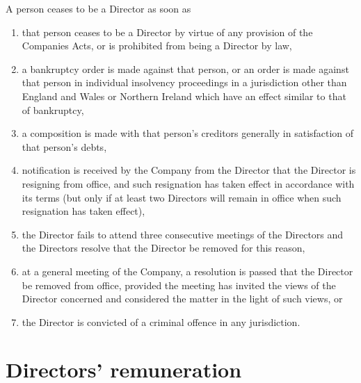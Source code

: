 \documentclass[a4paper,12pt]{article}
\renewcommand{\labelenumi}{\thesection.\arabic{enumi}}
\begin{document}
A person ceases to be a Director as soon as

\begin{enumerate}
  \renewcommand{\labelenumi}{(\alph{enumi})}
  \item that person ceases to be a Director by virtue of any provision of the Companies Acts, or is prohibited from being a Director by law,
  \item a bankruptcy order is made against that person, or an order is made against that person in individual insolvency proceedings in a jurisdiction other than England and Wales or Northern Ireland which have an effect similar to that of bankruptcy,
  \item a composition is made with that person’s creditors generally in satisfaction of that person’s debts,
  \item notification is received by the Company from the Director that the Director is resigning from office, and such resignation has taken effect in accordance with its terms (but only if at least two Directors will remain in office when such resignation has taken effect),
  \item the Director fails to attend three consecutive meetings of the Directors and the Directors resolve that the Director be removed for this reason,
  \item at a general meeting of the Company, a resolution is passed that the Director be removed from office, provided the meeting has invited the views of the Director concerned and considered the matter in the light of such views, or
  \item the Director is convicted of a criminal offence in any jurisdiction. %
\end{enumerate}

\section{Directors’ remuneration}
\end{document}
